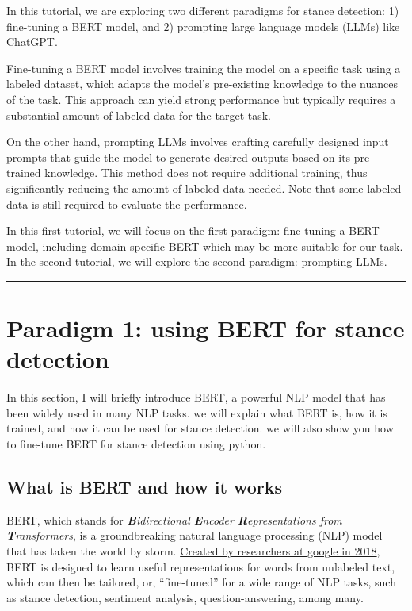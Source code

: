 \documentclass[11pt]{article}
\begin{document}
    In this tutorial, we are exploring two different paradigms for stance
detection: 1) fine-tuning a BERT model, and 2) prompting large language
models (LLMs) like ChatGPT.

Fine-tuning a BERT model involves training the model on a specific task
using a labeled dataset, which adapts the model's pre-existing knowledge
to the nuances of the task. This approach can yield strong performance
but typically requires a substantial amount of labeled data for the
target task.

On the other hand, prompting LLMs involves crafting carefully designed
input prompts that guide the model to generate desired outputs based on
its pre-trained knowledge. This method does not require additional
training, thus significantly reducing the amount of labeled data needed.
Note that some labeled data is still required to evaluate the
performance.

In this first tutorial, we will focus on the first paradigm: fine-tuning
a BERT model, including domain-specific BERT which may be more suitable
for our task. In
\href{https://colab.research.google.com/drive/1IFr6Iz1YH9XBWUKcWZyTU-1QtxgYqrmX?usp=sharing}{the
second tutorial}, we will explore the second paradigm: prompting LLMs.

    \begin{center}\rule{0.5\linewidth}{0.5pt}\end{center}

    \hypertarget{paradigm-1-using-bert-for-stance-detection}{%
\section{Paradigm 1: using BERT for stance
detection}\label{paradigm-1-using-bert-for-stance-detection}}

In this section, I will briefly introduce BERT, a powerful NLP model
that has been widely used in many NLP tasks. we will explain what BERT
is, how it is trained, and how it can be used for stance detection. we
will also show you how to fine-tune BERT for stance detection using
python.

    \hypertarget{what-is-bert-and-how-it-works}{%
\subsection{What is BERT and how it
works}\label{what-is-bert-and-how-it-works}}

BERT, which stands for \emph{\textbf{B}idirectional \textbf{E}ncoder
\textbf{R}epresentations from \textbf{T}ransformers}, is a
groundbreaking natural language processing (NLP) model that has taken
the world by storm. \href{https://arxiv.org/pdf/1810.04805.pdf}{Created
by researchers at google in 2018}, BERT is designed to learn useful
representations for words from unlabeled text, which can then be
tailored, or, ``fine-tuned'' for a wide range of NLP tasks, such as
stance detection, sentiment analysis, question-answering, among many.
\end{document}
